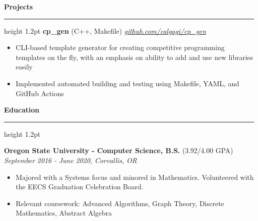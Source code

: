 \documentclass{article}
\def\hrulefill{\leavevmode\leaders\hrule height 1.2pt\hfill\kern\z}
\begin{document}
\noindent \large \textbf{Projects } \hrulefill
\vskip 0.1in
\noindent \normalsize \textbf{cp\_gen} \footnotesize (C++, Makefile) \hfill \small \textit{\href{https://github.com/calgagi/cp_gen}{github.com/calgagi/cp\_gen}}
\begin{itemize}
\item CLI-based template generator for creating competitive programming templates on the fly, with an emphasis on ability to add and use new libraries easily
\item Implemented automated building and testing using Makefile, YAML, and GitHub Actions
\end{itemize}

\vskip 0.1in

\noindent \large \textbf{Education } \hrulefill
\vskip 0.1in

\noindent \normalsize \textbf{Oregon State University - Computer Science, B.S.} \footnotesize (3.92/4.00 GPA) \hfill \small \textit{September 2016 - June 2020, Corvallis, OR}
\begin{itemize}
\item Majored with a Systems focus and minored in Mathematics. Volunteered with the EECS Graduation Celebration Board.
\item Relevant coursework: Advanced Algorithms, Graph Theory, Discrete Mathematics, Abstract Algebra
\end{itemize}
\end{document}

